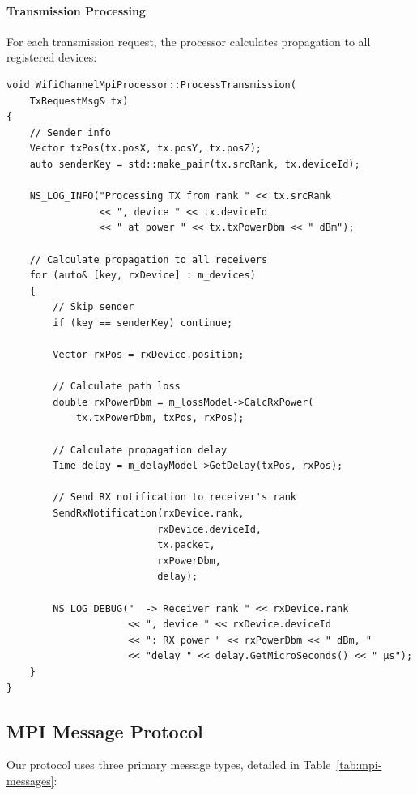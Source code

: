 \paragraph{Transmission Processing}
For each transmission request, the processor calculates propagation to all registered devices:

\begin{lstlisting}[style=cpp, caption={Transmission processing and propagation}]
void WifiChannelMpiProcessor::ProcessTransmission(
    TxRequestMsg& tx)
{
    // Sender info
    Vector txPos(tx.posX, tx.posY, tx.posZ);
    auto senderKey = std::make_pair(tx.srcRank, tx.deviceId);
    
    NS_LOG_INFO("Processing TX from rank " << tx.srcRank
                << ", device " << tx.deviceId
                << " at power " << tx.txPowerDbm << " dBm");
    
    // Calculate propagation to all receivers
    for (auto& [key, rxDevice] : m_devices)
    {
        // Skip sender
        if (key == senderKey) continue;
        
        Vector rxPos = rxDevice.position;
        
        // Calculate path loss
        double rxPowerDbm = m_lossModel->CalcRxPower(
            tx.txPowerDbm, txPos, rxPos);
        
        // Calculate propagation delay
        Time delay = m_delayModel->GetDelay(txPos, rxPos);
        
        // Send RX notification to receiver's rank
        SendRxNotification(rxDevice.rank,
                          rxDevice.deviceId,
                          tx.packet,
                          rxPowerDbm,
                          delay);
        
        NS_LOG_DEBUG("  -> Receiver rank " << rxDevice.rank
                     << ", device " << rxDevice.deviceId
                     << ": RX power " << rxPowerDbm << " dBm, "
                     << "delay " << delay.GetMicroSeconds() << " μs");
    }
}
\end{lstlisting}

\subsection{MPI Message Protocol}

Our protocol uses three primary message types, detailed in Table~\ref{tab:mpi-messages}:

